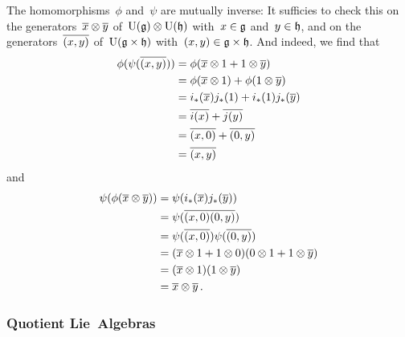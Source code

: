 \begin{example}
\begin{itemize}
      The homomorphisms~$\phi$ and~$\psi$ are mutually inverse:
      It sufficies to check this on the generators~$\overline{x} \otimes \overline{y}$ of~$\operatorname{U}(\mathfrak{g}) \otimes \operatorname{U}(\mathfrak{h})$ with~$x \in \mathfrak{g}$ and~$y \in \mathfrak{h}$, and on the generators~$\overline{(x,y)}$ of~$\operatorname{U}(\mathfrak{g} \times \mathfrak{h})$ with~$(x,y) \in \mathfrak{g} \times \mathfrak{h}$.
      And indeed, we find that
      \begin{align*}
        \phi( \psi( \overline{(x,y)} ) )
        &=
        \phi( \overline{x} \otimes 1 + 1 \otimes \overline{y} )
        \\
        &=
        \phi( \overline{x} \otimes 1 ) + \phi( 1 \otimes \overline{y} )
        \\
        &=
        i_*(\overline{x}) j_*(1) + i_*(1) j_*(\overline{y})
        \\
        &=
        \overline{i(x)} + \overline{j(y)}
        \\
        &=
        \overline{(x,0)} + \overline{(0,y)}
        \\
        &=
        \overline{(x,y)}
      \end{align*}
      and
      \begin{align*}
        \psi( \phi( \overline{x} \otimes \overline{y} ) )
        &=
        \psi( i_*(\overline{x}) j_*(\overline{y}) )
        \\
        &=
        \psi( \overline{(x,0)} \overline{(0,y)} )
        \\
        &=
        \psi( \overline{(x,0)} ) \psi( \overline{(0,y)} )
        \\
        &=
        ( \overline{x} \otimes 1 + 1 \otimes 0 ) ( 0 \otimes 1 + 1 \otimes \overline{y} )
        \\
        &=
        (\overline{x} \otimes 1) (1 \otimes \overline{y})
        \\
        &=
        \overline{x} \otimes \overline{y} \,.
      \end{align*}
  \end{itemize}
\end{example}





\subsubsection{Quotient Lie~Algebras}


